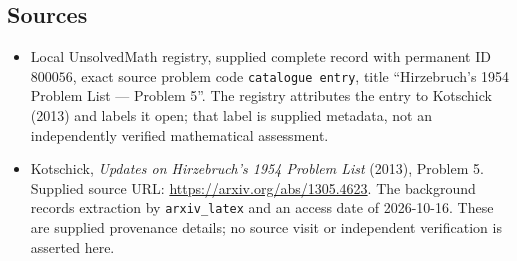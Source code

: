 \documentclass[11pt]{article}
\begin{document}
\subsection{Sources}
\begin{itemize}
\item Local UnsolvedMath registry, supplied complete record with permanent ID \(800056\), exact source problem code \texttt{catalogue entry}, title ``Hirzebruch's 1954 Problem List --- Problem 5''. The registry attributes the entry to Kotschick (2013) and labels it open; that label is supplied metadata, not an independently verified mathematical assessment.
\item Kotschick, \emph{Updates on Hirzebruch's 1954 Problem List} (2013), Problem 5. Supplied source URL: \url{https://arxiv.org/abs/1305.4623}. The background records extraction by \texttt{arxiv\_latex} and an access date of 2026-10-16. These are supplied provenance details; no source visit or independent verification is asserted here.
\end{itemize}
\end{document}
